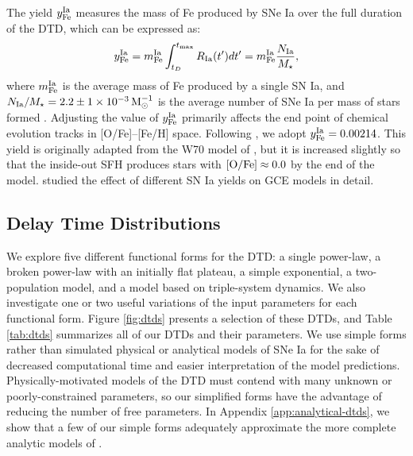 \documentclass[twocolumn,twocolappendix,linenumbers,trackchanges]{aastex631}
\begin{document}
The yield $y_{\rm Fe}^{\rm Ia}$ measures the mass of Fe produced by SNe Ia over the full duration of the DTD, which can be expressed as:
\begin{equation}
    y_{\rm Fe}^{\rm Ia} = m_{\rm Fe}^{\rm Ia} \int_{t_D}^{t_{\rm max}} R_{\rm Ia}(t')dt' = m_{\rm Fe}^{\rm Ia} \frac{N_{\rm Ia}}{M_\star},
    \label{eq:dtd-integral}
\end{equation}
where $m_{\rm Fe}^{\rm Ia}$ is the average mass of Fe produced by a single SN Ia, and $N_{\rm Ia}/M_\star=2.2\pm1\times10^{-3}\,{\rm M}_\odot^{-1}$ is the average number of SNe Ia per mass of stars formed \citep{MaozMannucci2012-SNeIaReview}. 
Adjusting the value of $y_{\rm Fe}^{\rm Ia}$ primarily affects the end point of chemical evolution tracks in [O/Fe]--[Fe/H] space. 
Following , we adopt $y_{\rm Fe}^{\rm Ia}=0.00214$. This yield is originally adapted from the W70 model of \citet{Iwamoto1999-SNIaYields}, but it is increased slightly so that the inside-out SFH produces stars with ${\rm [O/Fe]}\approx 0.0$ by the end of the model.
\citet{Palla2021-SNIaYield} studied the effect of different SN Ia yields on GCE models in detail.

\subsection{Delay Time Distributions}
\label{sec:dtd-models}

We explore five different functional forms for the DTD: a single power-law, a broken power-law with an initially flat plateau, a simple exponential, a two-population model, and a model based on triple-system dynamics. We also investigate one or two useful variations of the input parameters for each functional form. Figure \ref{fig:dtds} presents a selection of these DTDs, and Table \ref{tab:dtds} summarizes all of our DTDs and their parameters. We use simple forms rather than simulated physical or analytical models of SNe Ia for the sake of decreased computational time and easier interpretation of the model predictions. Physically-motivated models of the DTD must contend with many unknown or poorly-constrained parameters, so our simplified forms have the advantage of reducing the number of free parameters. In Appendix \ref{app:analytical-dtds}, we show that a few of our simple forms adequately approximate the more complete analytic models of \citet{Greggio2005-AnalyticalRates}. 
\end{document}
